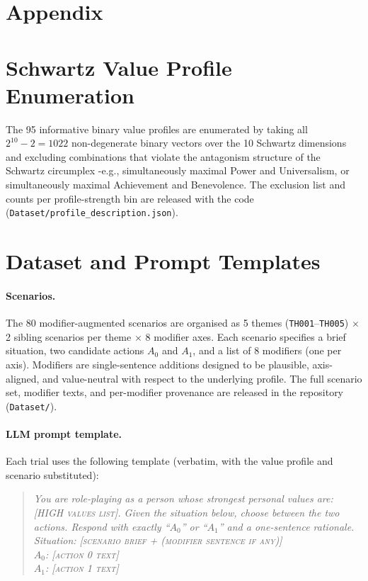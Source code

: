 \documentclass[11pt]{article}
\begin{document}
\section*{Appendix}

\section{Schwartz Value Profile Enumeration}
\label{app:profiles}

The 95 informative binary value profiles are enumerated by taking all $2^{10}-2 = 1022$ non-degenerate binary vectors over the 10 Schwartz dimensions and excluding combinations that violate the antagonism structure of the Schwartz circumplex \citep{schwartz2012refined}-e.g., simultaneously maximal Power and Universalism, or simultaneously maximal Achievement and Benevolence. The exclusion list and counts per profile-strength bin are released with the code (\texttt{Dataset/profile\_description.json}).

\section{Dataset and Prompt Templates}
\label{app:dataset}

\paragraph{Scenarios.} The 80 modifier-augmented scenarios are organised as 5 themes (\texttt{TH001}--\texttt{TH005}) $\times$ 2 sibling scenarios per theme $\times$ 8 modifier axes. Each scenario specifies a brief situation, two candidate actions $A_0$ and $A_1$, and a list of 8 modifiers (one per axis). Modifiers are single-sentence additions designed to be plausible, axis-aligned, and value-neutral with respect to the underlying profile. The full scenario set, modifier texts, and per-modifier provenance are released in the repository (\texttt{Dataset/}).

\paragraph{LLM prompt template.} Each trial uses the following template (verbatim, with the value profile and scenario substituted):

\begin{quote}\small\itshape
You are role-playing as a person whose strongest personal values are:
\textsc{[HIGH values list]}. Given the situation below, choose between the two
actions. Respond with exactly ``$A_0$'' or ``$A_1$'' and a one-sentence
rationale.\\[2pt]
Situation: \textsc{[scenario brief + (modifier sentence if any)]}\\
$A_0$: \textsc{[action 0 text]}\\
$A_1$: \textsc{[action 1 text]}
\end{quote}
\end{document}
